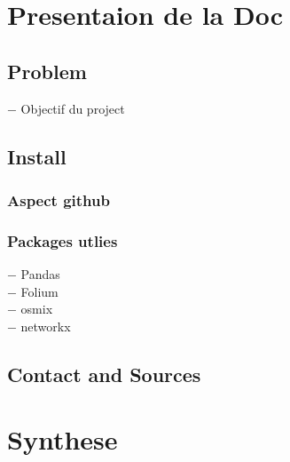 \documentclass{beamer}
\begin{document}
\section{Presentaion de la Doc}

    \subsection{Problem}
\begin{frame}
$-$ Objectif du project
\end{frame}
    \subsection{Install}
         \subsubsection{Aspect github}
           \subsubsection{Packages utlies}
 \begin{frame}
 $-$ Pandas \\
 $-$ Folium \\
 $-$ osmix \\
 $-$ networkx\\
 
 
\end{frame}

    \subsection{Contact and Sources}

\section{Synthese}
\end{document}
